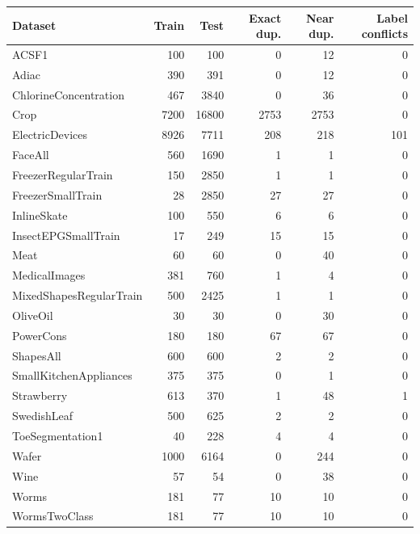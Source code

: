 \begin{tabular}{lrrrrr}
\toprule
Dataset & Train & Test & Exact dup. & Near dup. & Label conflicts \\
\midrule
ACSF1 & 100 & 100 & 0 & 12 & 0 \\
Adiac & 390 & 391 & 0 & 12 & 0 \\
ChlorineConcentration & 467 & 3840 & 0 & 36 & 0 \\
Crop & 7200 & 16800 & 2753 & 2753 & 0 \\
ElectricDevices & 8926 & 7711 & 208 & 218 & 101 \\
FaceAll & 560 & 1690 & 1 & 1 & 0 \\
FreezerRegularTrain & 150 & 2850 & 1 & 1 & 0 \\
FreezerSmallTrain & 28 & 2850 & 27 & 27 & 0 \\
InlineSkate & 100 & 550 & 6 & 6 & 0 \\
InsectEPGSmallTrain & 17 & 249 & 15 & 15 & 0 \\
Meat & 60 & 60 & 0 & 40 & 0 \\
MedicalImages & 381 & 760 & 1 & 4 & 0 \\
MixedShapesRegularTrain & 500 & 2425 & 1 & 1 & 0 \\
OliveOil & 30 & 30 & 0 & 30 & 0 \\
PowerCons & 180 & 180 & 67 & 67 & 0 \\
ShapesAll & 600 & 600 & 2 & 2 & 0 \\
SmallKitchenAppliances & 375 & 375 & 0 & 1 & 0 \\
Strawberry & 613 & 370 & 1 & 48 & 1 \\
SwedishLeaf & 500 & 625 & 2 & 2 & 0 \\
ToeSegmentation1 & 40 & 228 & 4 & 4 & 0 \\
Wafer & 1000 & 6164 & 0 & 244 & 0 \\
Wine & 57 & 54 & 0 & 38 & 0 \\
Worms & 181 & 77 & 10 & 10 & 0 \\
WormsTwoClass & 181 & 77 & 10 & 10 & 0 \\
\bottomrule
\end{tabular}
